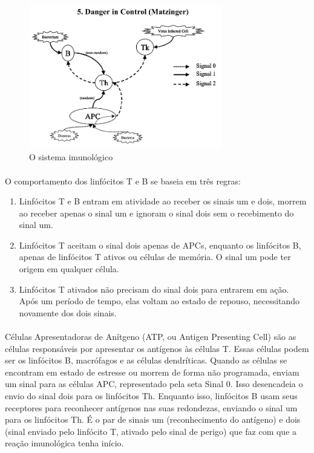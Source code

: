 \documentclass{iiufrgs}
\begin{document}
\begin{figure}[h]
\centering
\includegraphics[width=0.75\textwidth]{img/signals5-danger.png}
\caption{O sistema imunológico}
\end{figure}

\paragraph{}O comportamento dos linfócitos T e B se baseia em três regras:

\begin{enumerate}
\item Linfócitos T e B entram em atividade ao receber os sinais um e dois, morrem ao receber apenas o sinal um e ignoram o sinal dois sem o recebimento do sinal um.
\item Linfócitos T aceitam o sinal dois apenas de APCs, enquanto os linfócitos B, apenas de linfócitos T ativos ou células de memória. O sinal um pode ter origem em qualquer célula.
\item Linfócitos T ativados não precisam do sinal dois para entrarem em ação. Após um período de tempo, elas voltam ao estado de repouso, necessitando novamente dos dois sinais.
\end{enumerate}

\paragraph{}Células Apresentadoras de Anítgeno (ATP, ou Antigen Presenting Cell) são as células responsáveis por apresentar os antígenos às células T. Essas células podem ser os linfócitos B, macrófagos e as células dendríticas. Quando as células se encontram em estado de estresse ou morrem de forma não programada, enviam um sinal para as células APC, representado pela seta Sinal 0. Isso desencadeia o envio do sinal dois para os linfócitos Th. Enquanto isso, linfócitos B usam seus receptores para reconhecer antígenos nas suas redondezas, enviando o sinal um para os linfócitos Th. É o par de sinais um (reconhecimento do antígeno) e dois (sinal enviado pelo linfócito T, ativado pelo sinal de perigo) que faz com que a reação imunológica tenha início.
\end{document}
